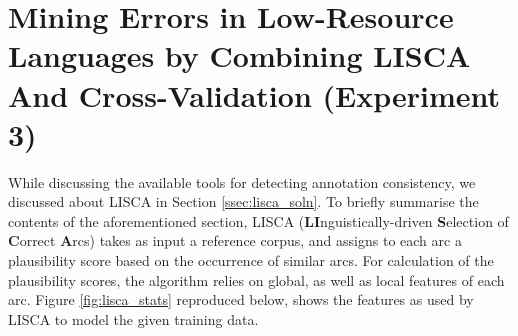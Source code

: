 \chapter{Mining Errors in Low-Resource Languages by Combining LISCA And Cross-Validation (Experiment 3)}
\label{chap:lisca}

While discussing the available tools for detecting annotation consistency, we discussed about LISCA \citep{lisca} in Section \ref{ssec:lisca_soln}. To briefly summarise the contents of the aforementioned section, LISCA (\textbf{LI}nguistically-driven \textbf{S}election of \textbf{C}orrect \textbf{A}rcs) takes as input a reference corpus, and assigns to each arc a plausibility score based on the occurrence of similar arcs. For calculation of the plausibility scores, the algorithm relies on global, as well as local features of each arc. Figure \ref{fig:lisca_stats} reproduced below, shows the features as used by LISCA to model the given training data.

